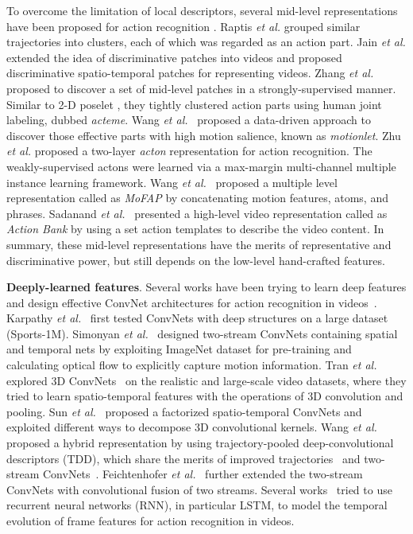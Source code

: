 \documentclass[10pt,journal,compsoc]{IEEEtran}
\begin{document}
To overcome the limitation of local descriptors, several mid-level representations have been proposed for action recognition \cite{RaptisKS12,JainGRD13,WangQT13a,ZhangZD13,ZhuWYZT13,WangQT15b,SadanandC12}. Raptis \emph{et al.} \cite{RaptisKS12} grouped similar trajectories into clusters, each of which was regarded as an action part.  Jain \emph{et al.} \cite{JainGRD13} extended the idea of discriminative patches into videos and proposed discriminative spatio-temporal patches for representing videos. Zhang \emph{et al.} \cite{ZhangZD13} proposed to discover a set of mid-level patches in a strongly-supervised manner. Similar to 2-D poselet \cite{BourdevM09}, they tightly clustered action parts using human joint labeling, dubbed \emph{acteme}.  Wang \emph{et al.}~\cite{WangQT13a} proposed a data-driven approach to discover those effective parts with high motion salience, known as {\em motionlet}. Zhu \emph{et al.} \cite{ZhuWYZT13} proposed a two-layer \emph{acton} representation for action recognition. The weakly-supervised actons were learned via a max-margin multi-channel multiple instance learning framework. Wang \emph{et al.}~\cite{WangQT15b} proposed a multiple level representation called as {\em MoFAP} by concatenating motion features, atoms, and phrases. Sadanand {\em et al.}~\cite{SadanandC12} presented a high-level video representation called as {\em Action Bank} by using a set action templates to describe the video content. In summary, these mid-level representations have the merits of representative and discriminative power, but still depends on the low-level hand-crafted features.

{\bf Deeply-learned features}. Several works have been trying to learn deep features and design effective ConvNet architectures for action recognition in videos~\cite{KarpathyTSLSF14,SimonyanZ14,TranBFTP15,JiXYY13,SunJYS15,WangQT15a,Ng15,DonahueJ2015,WuWJYX15,varol}. Karpathy \emph{et al.}~\cite{KarpathyTSLSF14} first tested ConvNets with deep structures on a large dataset (Sports-1M). Simonyan \emph{et al.}~\cite{SimonyanZ14} designed two-stream ConvNets containing spatial and temporal nets by exploiting ImageNet dataset for pre-training and calculating optical flow to explicitly capture motion information. Tran \emph{et al.}~\cite{TranBFTP15} explored 3D ConvNets~\cite{JiXYY13} on the realistic and large-scale video datasets, where they tried to learn spatio-temporal features with the operations of 3D convolution and pooling. Sun \emph{et al.}~\cite{SunJYS15} proposed a factorized spatio-temporal ConvNets and exploited different ways to decompose 3D convolutional kernels. Wang {\em et al.}~\cite{WangQT15a} proposed a hybrid representation by using trajectory-pooled deep-convolutional descriptors (TDD), which share the merits of improved trajectories~\cite{WangS13a} and two-stream ConvNets~\cite{SimonyanZ14}.  Feichtenhofer \emph{et al.}~\cite{FeichtenhoferPZ16} further extended the two-stream ConvNets with convolutional fusion of two streams. Several works~\cite{Ng15,WuWJYX15,DonahueJ2015} tried to use recurrent neural networks (RNN), in particular LSTM, to model the temporal evolution of frame features for action recognition in videos.
\end{document}
